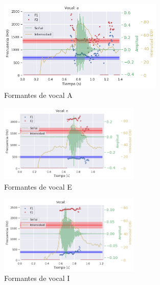 


\begin{figure}[H]
\caption{Formantes de vocal A}
\label{img:formantes_a}
\begin{center}
\includegraphics[width=0.7\textwidth]{imagenes/04_02_a.png}
\end{center}
\end{figure}

\begin{figure}[H]
\caption{Formantes de vocal E}
\label{img:formantes_e}
\begin{center}
\includegraphics[width=0.6\textwidth]{imagenes/04_02_e.png}
\end{center}
\end{figure}

\begin{figure}[H]
\caption{Formantes de vocal I}
\label{img:formantes_i}
\begin{center}
\includegraphics[width=0.6\textwidth]{imagenes/04_02_i.png}
\end{center}
\end{figure}

